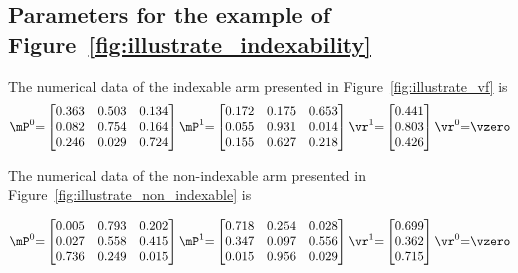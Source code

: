 \subsection{Parameters for the example of Figure~\ref{fig:illustrate_indexability}}
\label{apx:non_indexable_example}

The numerical data of the indexable arm presented in Figure~\ref{fig:illustrate_vf} is
\begin{equation*}
    \mP^0{=}\begin{bmatrix}
        0.363 & 0.503 & 0.134 \\
        0.082 & 0.754 & 0.164 \\
        0.246 & 0.029 & 0.724
    \end{bmatrix}
    \mP^1{=}\begin{bmatrix}
        0.172 & 0.175 & 0.653 \\
        0.055 & 0.931 & 0.014 \\
        0.155 & 0.627 & 0.218
    \end{bmatrix}
    \vr^1{=}\begin{bmatrix}
        0.441 \\
        0.803 \\
        0.426
    \end{bmatrix}
    \vr^0{=}\vzero
\end{equation*}

\noindent
The numerical data of the non-indexable arm presented in Figure~\ref{fig:illustrate_non_indexable} is

\begin{equation*}
    \mP^0{=}\begin{bmatrix}
        0.005 & 0.793 & 0.202 \\
        0.027 & 0.558 & 0.415 \\
        0.736 & 0.249 & 0.015
    \end{bmatrix}
    \mP^1{=}\begin{bmatrix}
        0.718 & 0.254 & 0.028 \\
        0.347 & 0.097 & 0.556 \\
        0.015 & 0.956 & 0.029
    \end{bmatrix}
    \vr^1{=}\begin{bmatrix}
        0.699 \\
        0.362 \\
        0.715
    \end{bmatrix} \vr^0{=}\vzero
\end{equation*}

